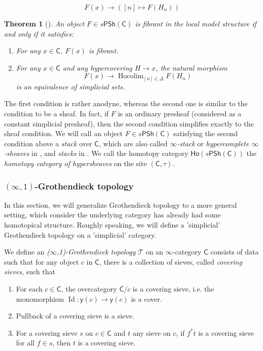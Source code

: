 \documentclass[12pt]{amsart}
\newtheorem{thm}{Theorem}[section]
\theoremstyle{definition}
\theoremstyle{remark}
\numberwithin{equation}{section}
\newcommand{\CC}{{\mathsf C}}
\newcommand{\1}{{\mathbb{1}}}
\newcommand{\y}{\mathsf{y}}
\newcommand{\ho}{\mathsf{Ho}}
\newcommand{\psh}{\mathsf{PSh}}
\newcommand{\hocolim}{\operatorname{Hocolim}}
\newcommand{\id}{\operatorname{Id}}
\begin{document}
$$
F(x) \to ([n] \mapsto F(H_n))
$$
\begin{thm}[\cite{DHI04}]
    An object $F\in s\psh(\CC)$ is fibrant in the local model structure if and only if it satisfies:
    \begin{enumerate}
        \item For any $x\in \CC$, $F(x)$ is fibrant.
        \item For any $x\in \CC$ and any hypercovering $H\to x$, the natural morphism
        \begin{equation*}
            F(x)\to \hocolim_{[n]\in \Delta}F(H_n)
        \end{equation*}
        is an equivalence of simplicial sets.
    \end{enumerate}
\end{thm}
The first condition is rather anodyne, whereas the second one is similar to the condition to be a sheaf. In fact, if $F$ is an ordinary presheaf (considered as a constant simplicial presheaf), then the second condition simplifies exactly to the sheaf condition. We will call an object $F\in s\psh(\CC)$ satisfying the second condition above a {\it stack} over $\CC$, which are also called {\it $\infty$-stack} or {\it hypercomplete $\infty$-sheaves} in \cite{Lur09b}, and {\it stacks} in \cite{TV02}. We call the homotopy category $\ho(s\psh(\CC))$ the {\it homotopy category of hypersheaves} on the site $(\CC, \tau)$.



\subsubsection{$(\infty,1)$-Grothendieck topology}

In this section, we will generalize Grothendieck topology to a more general setting, which consider the underlying category has already had some homotopical structure. Roughly speaking, we will define a 'simplicial' Grothendieck topology on a 'simplicial' category.%

We define an {\it ($\infty$,1)-Grothendieck topology} $\mathcal{T}$ on an $\infty$-category $\mathsf{C}$ consists of data such that for any object $c$ in $\mathsf{C}$, there is a collection of sieves, called {\it covering sieves}, such that
\begin{enumerate}
	\item For each $c\in \mathsf{C}$, the overcategory $\mathsf{C}/c$ is a covering sieve, i.e. the monomorphism $\id:\y(c) \to \y(c)$ is a cover.
	\item Pullback of a covering sieve is a sieve.
	\item For a covering sieve $s$ on $c\in \mathsf{C}$ and $t$ any sieve on $c$, if $f^*t$ is a covering sieve for all $f\in s$, then $t$ is a covering sieve.
\end{enumerate}
\end{document}
